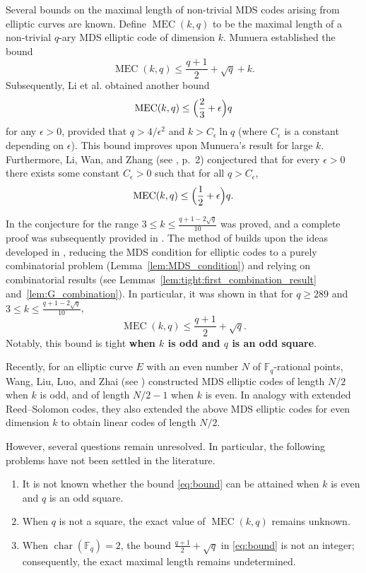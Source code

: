 \documentclass[journal,12pt,onecolumn]{IEEEtran}
\begin{document}
Several bounds on the maximal length of non-trivial MDS codes arising from elliptic curves are known.  
Define $\operatorname{MEC}(k,q)$ to be the maximal length of a non‑trivial $q$-ary MDS elliptic code of dimension $k$.  
Munuera \cite{MR1178199} established the bound  
\[
\operatorname{MEC}(k,q)\le \frac{q+1}{2}+\sqrt{q}+k.
\]
Subsequently, Li et al. \cite{7282884} obtained another bound
\[
\operatorname{MEC}(k,q)\le \Bigl(\frac23+\epsilon\Bigr)q
\]
for any $\epsilon>0$, provided that $q>4/\epsilon^2$ and $k>C_\epsilon\ln q$ (where $C_\epsilon$ is a constant depending on $\epsilon$). This bound improves upon Munuera's result for large $k$. Furthermore, Li, Wan, and Zhang (see \cite{7282884}, p.~2) conjectured that for every $\epsilon>0$ there exists some constant $C_\epsilon>0$ such that for all $q>C_\epsilon$,
\[
\operatorname{MEC}(k,q)\le \Bigl(\frac12+\epsilon\Bigr)q.
\]

In \cite{MR4564628} the conjecture for the range $3\le k\le \frac{q+1-2\sqrt{q}}{10}$ was proved, and a complete proof was subsequently provided in \cite{MR4756098}. The method of \cite{MR4564628} builds upon the ideas developed in \cite{7282884}, reducing the MDS condition for elliptic codes to a purely combinatorial problem (Lemma~\ref{lem:MDS_condition}) and relying on combinatorial results (see Lemmas~\ref{lem:tight:first_combination_result} and~\ref{lem:G_combination}). In particular, it was shown in \cite{MR4564628} that for $q\ge 289$ and $3\le k\le \frac{q+1-2\sqrt{q}}{10}$,
\begin{equation}\label{eq:bound}
    \operatorname{MEC}(k,q)\le \frac{q+1}{2}+\sqrt{q}.
\end{equation} 
Notably, this bound is tight \textbf{when $k$ is odd and $q$ is an odd square}.

{\color{blue}Recently, for an elliptic curve $E$ with an even number $N$ of $\mathbb{F}_q$-rational points, Wang, Liu, Luo, and Zhai (see \cite{wang2025nonreedsolomontypemdscodes}) constructed MDS elliptic codes of length $N/2$ when $k$ is odd, and of length $N/2-1$ when $k$ is even. In analogy with extended Reed–Solomon codes, they also extended the above MDS elliptic codes for even dimension $k$ to obtain linear codes of length $N/2$.}


However, several questions remain unresolved. In particular, the following problems have not been settled in the literature.
\begin{enumerate}
    \item \label{Q:1}It is not known whether the bound \eqref{eq:bound}
    can be attained when $k$ is even and $q$ is an odd square.
    \item \label{Q:2}When $q$ is not a square, the exact value of $\operatorname{MEC}(k,q)$ remains unknown.
    \item \label{Q:3}When $\operatorname{char}(\mathbb{F}_q)=2$, the bound $\frac{q+1}{2}+\sqrt{q}$ in \eqref{eq:bound} is not an integer; consequently, the exact maximal length remains undetermined.
\end{enumerate}
 
\end{document}
